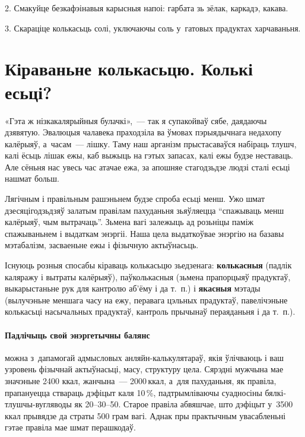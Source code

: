 2. Смакуйце безкафэінавыя карысныя напоі: гарбата зь зёлак, каркадэ, какава.

3. Скараціце колькасьць солі, уключаючы соль у~гатовых прадуктах харчаваньня.


\section{Кіраваньне колькасьцю. Колькі есьці?}

«Гэта ж нізкакалярыйныя булачкі»,~--- так я супакойваў сябе, даядаючы дзявятую. Эвалюцыя чалавека праходзіла ва ўмовах пэрыядычнага недахопу калёрыяў, а~часам~--- лішку. Таму наш арганізм прыстасаваўся набіраць тлушч, калі ёсьць лішак ежы, каб выжыць на гэтых запасах, калі ежы будзе неставаць. Але сёньня нас увесь час атачае ежа, за апошняе стагодзьдзе людзі сталі есьці нашмат больш. 


Лягічным і правільным рашэньнем будзе спроба есьці менш. Ужо шмат дзесяцігодзьдзяў залатым правілам пахуданьня зьяўляецца ``спажываць менш калёрыяў, чым вытрачаць''. Зьмена вагі залежыць ад розьніцы паміж спажываньнем і выдаткам энэргіі. Наша цела выдаткоўвае энэргію на базавы мэтабалізм, засваеньне ежы і фізычную актыўнасьць.

Існуюць розныя спосабы кіраваць колькасьцю зьедзенага: \textbf{колькасныя} (падлік каляражу і вытраты калёрыяў), паўколькасныя (зьмена прапорцыяў прадуктаў, выкарыстаньне рук для кантролю аб'ёму і да т.~п.) і \textbf{якасныя} мэтады (вылучэньне меншага часу на ежу, перавага цэльных прадуктаў, павелічэньне колькасьці насычальных прадуктаў, кантроль прычынаў пераяданьня і да т.~п.).

\paragraph{Падлічыць свой энэргетычны балянс} можна з~дапамогай адмысловых анляйн-калькулятараў, якія ўлічваюць і ваш узровень фізычнай актыўнасьці, масу, структуру цела. Сярэдні мужчына мае значэньне 2400 ккал, жанчына~--- 2000\,ккал, а~для пахуданьня, як правіла, прапануецца ствараць дэфіцыт каля 10\,\%, падтрымліваючы суадносіны бялкі-тлушчы-вугляводы як 20--30--50. Старое правіла абвяшчае, што дэфіцыт у~3500\,ккал прывядзе да страты 500 грам вагі. Аднак пры практычным увасабленьні гэтае правіла мае шмат перашкодаў.

